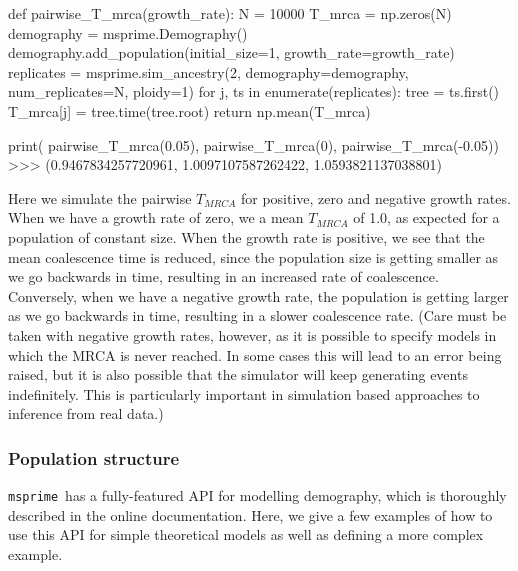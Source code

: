 \documentclass[graybox]{svmult}
\newcommand{\msprime}[0]{\texttt{msprime}}
\begin{document}
\begin{pythoncode}
def pairwise_T_mrca(growth_rate):
    N = 10000
    T_mrca = np.zeros(N)
    demography = msprime.Demography()
    demography.add_population(initial_size=1, growth_rate=growth_rate)
    replicates = msprime.sim_ancestry(2, demography=demography,
        num_replicates=N, ploidy=1)
    for j, ts in enumerate(replicates):
        tree = ts.first()
        T_mrca[j] = tree.time(tree.root)
    return np.mean(T_mrca)

print(
    pairwise_T_mrca(0.05), pairwise_T_mrca(0),
    pairwise_T_mrca(-0.05))
>>> (0.9467834257720961, 1.0097107587262422, 1.0593821137038801)
\end{pythoncode}

Here we simulate the pairwise \(T_{MRCA}\) for positive, zero and
negative growth rates. When we have a growth rate of zero, we
a mean \(T_{MRCA}\) of 1.0, as expected for a population of constant size. When the growth rate is positive, we see that the
mean coalescence time is reduced, since the population size is getting
smaller as we go backwards in time, resulting in an increased rate of
coalescence. Conversely, when we have a negative growth rate, the
population is getting larger as we go backwards in time, resulting in a
slower coalescence rate. (Care must be taken with negative growth rates,
however, as it is possible to specify models in which the MRCA is never
reached. In some cases this will lead to an error being raised, but it
is also possible that the simulator will keep generating events
indefinitely. This is particularly important in simulation based
approaches to inference from real data.)

\subsubsection{Population structure}\label{population-structure}
\msprime\ has a fully-featured API for modelling demography, which
is thoroughly described in the online documentation. Here, we give a few examples
of how to use this API for simple theoretical models as well as
defining a more complex example.
\end{document}
